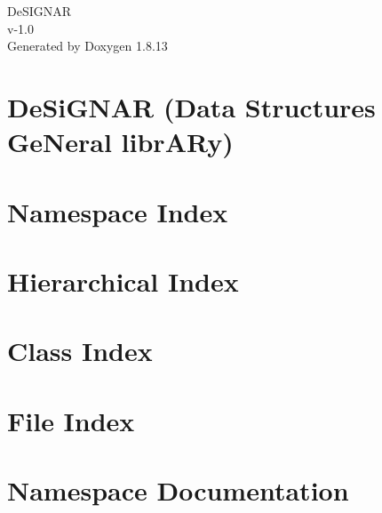 \documentclass[twoside]{book}
\newcommand{\+}{\discretionary{\mbox{\scriptsize$\hookleftarrow$}}{}{}}
\newcommand{\clearemptydoublepage}{%
  \newpage{\pagestyle{empty}\cleardoublepage}%
}
\begin{document}
\hypersetup{pageanchor=false,
             bookmarksnumbered=true,
             pdfencoding=unicode
            }
\begin{titlepage}
\vspace*{7cm}
\begin{center}%
{\Large De\+S\+I\+G\+N\+AR \\[1ex]\large v-\/1.\+0 }\\
\vspace*{1cm}
{\large Generated by Doxygen 1.8.13}\\
\end{center}
\end{titlepage}
\clearemptydoublepage
{}
\tableofcontents
\clearemptydoublepage
{}
\hypersetup{pageanchor=true}

\chapter{De\+Si\+G\+N\+AR (Data Structures Ge\+Neral libr\+A\+Ry)}
\label{md__de_si_g_n_a_r__r_e_a_d_m_e}

\chapter{Namespace Index}

\chapter{Hierarchical Index}

\chapter{Class Index}

\chapter{File Index}

\chapter{Namespace Documentation}

\end{document}
